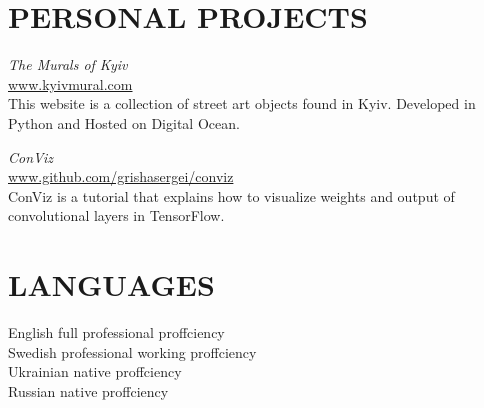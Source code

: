 \documentclass[margin, 10pt]{res} %
\begin{document}
\begin{resume}

\section{PERSONAL PROJECTS} 
{\sl The Murals of Kyiv }\\
\url{www.kyivmural.com} \\
This website is a collection of street art objects found in Kyiv. Developed  in Python and Hosted on Digital Ocean. 

{\sl ConViz }\\
\url{www.github.com/grishasergei/conviz} \\
ConViz is a tutorial that explains how to visualize weights and output of convolutional layers in TensorFlow.


\section{LANGUAGES} 

English \hfill full professional proffciency\\
Swedish \hfill professional working proffciency\\
Ukrainian \hfill native proffciency\\
Russian \hfill native proffciency


\end{resume}
\end{document}
